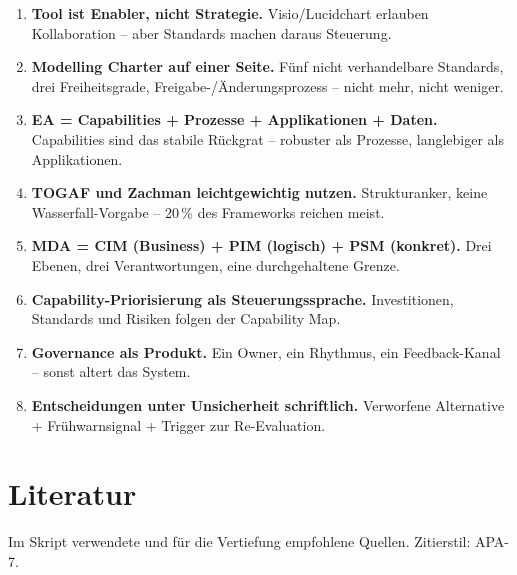 \documentclass[11pt,a4paper,oneside]{article}
\begin{document}
\begin{enumerate}
  \item \textbf{Tool ist Enabler, nicht Strategie.} Visio/Lucidchart erlauben Kollaboration -- aber Standards machen daraus Steuerung.
  \item \textbf{Modelling Charter auf einer Seite.} Fünf nicht verhandelbare Standards, drei Freiheitsgrade, Freigabe-/Änderungsprozess -- nicht mehr, nicht weniger.
  \item \textbf{EA = Capabilities + Prozesse + Applikationen + Daten.} Capabilities sind das stabile Rückgrat -- robuster als Prozesse, langlebiger als Applikationen.
  \item \textbf{TOGAF und Zachman leichtgewichtig nutzen.} Strukturanker, keine Wasserfall-Vorgabe -- 20\,\% des Frameworks reichen meist.
  \item \textbf{MDA = CIM (Business) + PIM (logisch) + PSM (konkret).} Drei Ebenen, drei Verantwortungen, eine durchgehaltene Grenze.
  \item \textbf{Capability-Priorisierung als Steuerungssprache.} Investitionen, Standards und Risiken folgen der Capability Map.
  \item \textbf{Governance als Produkt.} Ein Owner, ein Rhythmus, ein Feedback-Kanal -- sonst altert das System.
  \item \textbf{Entscheidungen unter Unsicherheit schriftlich.} Verworfene Alternative + Frühwarnsignal + Trigger zur Re-Evaluation.
\end{enumerate}

\clearpage
\section{Literatur}

Im Skript verwendete und für die Vertiefung empfohlene Quellen. Zitierstil: APA-7.
\end{document}

